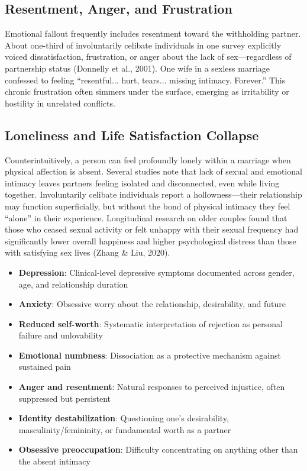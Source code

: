 \documentclass[12pt,openany]{book}
\numberwithin{equation}{chapter}
\begin{document}
\subsection{Resentment, Anger, and Frustration}

Emotional fallout frequently includes resentment toward the withholding partner. About one-third of involuntarily celibate individuals in one survey explicitly voiced dissatisfaction, frustration, or anger about the lack of sex---regardless of partnership status (Donnelly et al., 2001). One wife in a sexless marriage confessed to feeling ``resentful... hurt, tears... missing intimacy. Forever.'' This chronic frustration often simmers under the surface, emerging as irritability or hostility in unrelated conflicts.

\subsection{Loneliness and Life Satisfaction Collapse}

Counterintuitively, a person can feel profoundly lonely within a marriage when physical affection is absent. Several studies note that lack of sexual and emotional intimacy leaves partners feeling isolated and disconnected, even while living together. Involuntarily celibate individuals report a hollowness---their relationship may function superficially, but without the bond of physical intimacy they feel ``alone'' in their experience. Longitudinal research on older couples found that those who ceased sexual activity or felt unhappy with their sexual frequency had significantly lower overall happiness and higher psychological distress than those with satisfying sex lives (Zhang \& Liu, 2020).

\begin{itemize}
    \item \textbf{Depression}: Clinical-level depressive symptoms documented across gender, age, and relationship duration
    \item \textbf{Anxiety}: Obsessive worry about the relationship, desirability, and future
    \item \textbf{Reduced self-worth}: Systematic interpretation of rejection as personal failure and unlovability
    \item \textbf{Emotional numbness}: Dissociation as a protective mechanism against sustained pain
    \item \textbf{Anger and resentment}: Natural responses to perceived injustice, often suppressed but persistent
    \item \textbf{Identity destabilization}: Questioning one's desirability, masculinity/femininity, or fundamental worth as a partner
    \item \textbf{Obsessive preoccupation}: Difficulty concentrating on anything other than the absent intimacy
\end{itemize}
\end{document}
